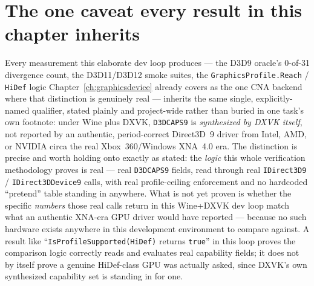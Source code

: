 \section{The one caveat every result in this chapter inherits}

Every measurement this elaborate dev loop produces --- the D3D9 oracle's 0-of-31 divergence
count, the D3D11/D3D12 smoke suites, the \texttt{GraphicsProfile.Reach} / \texttt{HiDef} logic
Chapter~\ref{ch:graphicsdevice} already covers as the one CNA backend where that distinction is
genuinely real --- inherits the same single, explicitly-named qualifier, stated plainly and
project-wide rather than buried in one task's own footnote: under Wine plus DXVK,
\texttt{D3DCAPS9} is \emph{synthesized by DXVK itself}, not reported by an authentic,
period-correct Direct3D~9 driver from Intel, AMD, or NVIDIA circa the real Xbox~360/Windows
XNA~4.0 era. The distinction is precise and worth holding onto exactly as stated: the
\emph{logic} this whole verification methodology proves is real --- real \texttt{D3DCAPS9}
fields, read through real \texttt{IDirect3D9} / \texttt{IDirect3DDevice9} calls, with real
profile-ceiling enforcement and no hardcoded ``pretend'' table standing in anywhere. What is
not yet proven is whether the specific \emph{numbers} those real calls return in this
Wine+DXVK dev loop match what an authentic XNA-era GPU driver would have reported --- because
no such hardware exists anywhere in this development environment to compare against. A result
like ``\texttt{IsProfileSupported(HiDef)} returns \texttt{true}'' in this loop proves the
comparison logic correctly reads and evaluates real capability fields; it does not by itself
prove a genuine HiDef-class GPU was actually asked, since DXVK's own synthesized capability set
is standing in for one.

